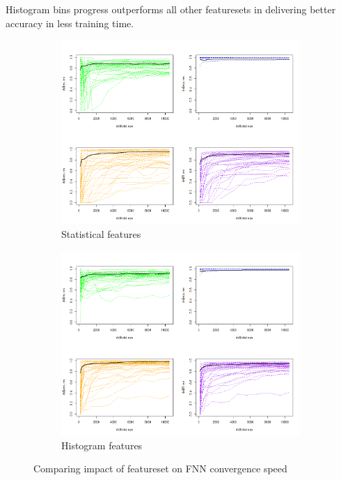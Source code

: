\documentclass[journal,article,submit,moreauthors,pdftex]{Definitions/mdpi}
\begin{document}
Histogram bins progress outperforms all other featuresets in delivering better accuracy in less training time.
\begin{figure}[H]
	\centering
	\begin{subfigure}{.5\textwidth}
		\centering
		\includegraphics[width=1\linewidth]{Definitions/images/fnn_statistical_set.png}
		\caption{Statistical features}
		\label{fig:fnn_balanced}
	\end{subfigure}%
	\begin{subfigure}{.5\textwidth}
		\centering
		\includegraphics[width=1\linewidth]{Definitions/images/fnn_hbin_set.png}
		\caption{Histogram features}
		\label{fig:fnn_imbalanced}
	\end{subfigure}%
	\caption{Comparing impact of featureset on FNN convergence speed}
	\label{fig:imbalance_dataset}
\end{figure} 
\end{document}
